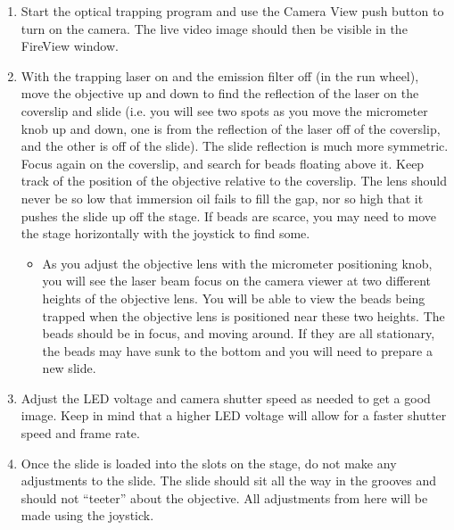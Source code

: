 \documentclass{../lab}
\begin{document}
\begin{enumerate}
    \item Start the optical trapping program and use the Camera View push button to turn on the camera. The live video image should then be visible in the FireView window.

    \item With the trapping laser on and the emission filter off (in the run wheel), move the objective up and down to find the reflection of the laser on the coverslip and slide (i.e. you will see two spots as you move the micrometer knob up and down, one is from the reflection of the laser off of the coverslip, and the other is off of the slide). The slide reflection is much more symmetric. Focus again on the coverslip, and search for beads floating above it. Keep track of the position of the objective relative to the coverslip. The lens should never be so low that immersion oil fails to fill the gap, nor so high that it pushes the slide up off the stage. If beads are scarce, you may need to move the stage horizontally with the joystick to find some.

    \begin{itemize}
        \item As you adjust the objective lens with the micrometer positioning knob, you will see the laser beam focus on the camera viewer at two different heights of the objective lens. You will be able to view the beads being trapped when the objective lens is positioned near these two heights. The beads should be in focus, and moving around. If they are all stationary, the beads may have sunk to the bottom and you will need to prepare a new slide.

    \end{itemize}

    \item Adjust the LED voltage and camera shutter speed as needed to get a good image. Keep in mind that a higher LED voltage will allow for a faster shutter speed and frame rate.

    \item Once the slide is loaded into the slots on the stage, do not make any adjustments to the slide. The slide should sit all the way in the grooves and should not ``teeter'' about the objective. All adjustments from here will be made using the joystick.

\end{enumerate}
\end{document}
